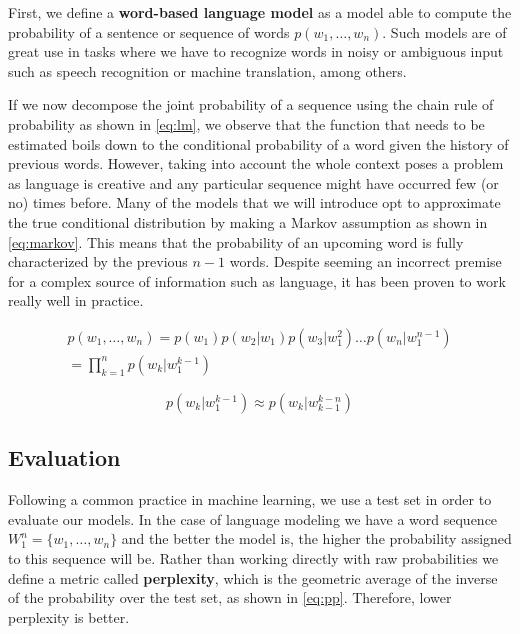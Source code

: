 First, we define a \textbf{word-based language model} as a model able to compute the probability of a sentence or sequence of words $p(w_1, \ldots ,w_n)$. Such models are of great use in tasks where we have to recognize words in noisy or ambiguous input such as speech recognition or machine translation, among others.

If we now decompose the joint probability of a sequence using the chain rule of probability as shown in \autoref{eq:lm}, we observe that the function that needs to be estimated boils down to the conditional probability of a word given the history of previous words. However, taking into account the whole context poses a problem as language is creative and any particular sequence might have occurred few (or no) times before.  Many of the models that we will introduce opt to approximate the true conditional distribution by making a Markov assumption as shown in \autoref{eq:markov}. This means that the probability of an upcoming word is fully characterized by the previous $n-1$ words. Despite seeming an incorrect premise for a complex source of information such as language, it has been proven to work really well in practice.

\begin{equation} \label{eq:lm}
	\begin{gathered}
		p(w_1, \ldots ,w_n)=p(w_1)p(w_2|w_1)p(w_3|w_{1}^{2}) \ldots p(w_n|w_{1}^{n-1}) \\
		= \prod_{k=1}^{n} p(w_k|w_{1}^{k-1})
	\end{gathered}
\end{equation}

\begin{equation} \label{eq:markov}
	p(w_k|w_{1}^{k-1}) \approx p(w_k|w_{k-1}^{k-n})
\end{equation}

\subsection{Evaluation}

Following a common practice in machine learning, we use a test set in order to evaluate our models. In the case of language modeling we have a word sequence $W_1^n=\{w_1, \ldots , w_n\}$ and the better the model is, the higher the probability assigned to this sequence will be. Rather than working directly with raw probabilities we define a metric called \textbf{perplexity}, which is the geometric average of the inverse of the probability over the test set, as shown in \autoref{eq:pp}. Therefore, lower perplexity is better.

